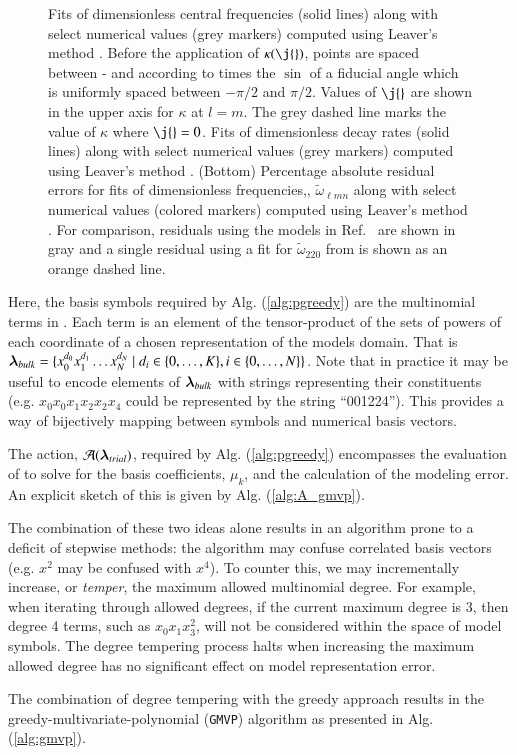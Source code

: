 \documentclass[twocolumn,aps,prd,floatfix,preprintnumbers,a4paper,nofootinbib,
superscriptaddress,10pt]{revtex4-1}
\newcommand{\cw}{\tilde{\omega}}
\def\lmn{_{\ell m n}}
\def\gmvp#1{greedy-multivariate-polynomial#1
  (\texttt{GMVP}#1)\gdef\gmvp{\texttt{GMVP}}}
\def\CwFitCalibrationRegion{\red{0.995} }
\begin{document}
\begin{figure}[htb]
\begin{tabular}{ll}
  \end{tabular}
	\caption{ Fits of dimensionless \qnm{} central frequencies (solid lines) along with select numerical values (grey markers) computed using Leaver's method \cite{Leaver85}.
  Before the application of $\kappa(\j{})$, points are spaced between -\CwFitCalibrationRegion and \CwFitCalibrationRegion according to \CwFitCalibrationRegion times the $\sin$ of a fiducial angle which is uniformly spaced between $-\pi/2$ and $\pi/2$. Values of $\j{}$ are shown in the upper axis for $\kappa$ at $l=m$.
  The grey dashed line marks the value of $\kappa$ where $\j{}=0$. Fits of dimensionless \qnm{} decay rates (solid lines) along with select numerical values (grey markers) computed using Leaver's method \cite{Leaver85}. (Bottom) Percentage absolute residual errors for fits of dimensionless \qnm{} frequencies,, $\cw\lmn$ along with select numerical values (colored markers) computed using Leaver's method \cite{Leaver85}. For comparison, residuals using the models in Ref.~\cite{Berti:2005ys} are shown in gray and a single residual using a fit for $\cw_{220}$ from \cite{Nagar:2018zoe} is shown as an orange dashed line.}
  \label{fig:qnm}
\end{figure}
%
\par Here, the basis symbols required by Alg. (\ref{alg:pgreedy}) are the multinomial terms in .
%
Each term is an element of the tensor-product of the sets of powers of each coordinate of a chosen representation of the models domain. That is ${\bm{\lambda}}_{bulk} = \{x_0^{d_0} x_1^{d_1} \ldots x_N^{d_N} \mid d_i \in \{0,\ldots,K\}, i \in \{0,\ldots,N\}\}$.
%
Note that in practice it may be useful to encode elements of ${\bm{\lambda}}_{bulk}$ with strings representing their constituents (e.g. $x_0 x_0 x_1 x_2 x_2 x_4$ could be represented by the string ``001224''). This provides a way of bijectively mapping between symbols and numerical basis vectors.
%
\par The action, $\mathcal{A}({\bm{\lambda}}_{trial})$, required by Alg. (\ref{alg:pgreedy}) encompasses the evaluation of  to solve for the basis coefficients, $\mu_k$, and the calculation of the modeling error.
%
An explicit sketch of this is given by Alg. (\ref{alg:A_gmvp}).
%
\par The combination of these two ideas alone results in an algorithm prone to a deficit of stepwise methods: the algorithm may confuse correlated basis vectors (e.g. $x^2$ may be confused with $x^4$).
%
To counter this, we may incrementally increase, or \textit{temper}, the maximum allowed multinomial degree.
%
For example, when iterating through allowed degrees, if the current maximum degree is 3, then degree 4 terms, such as $x_0x_1x_3^2$, will not be considered within the space of model symbols.
%
The degree tempering process halts when increasing the maximum allowed degree has no significant effect on model representation error.
%
\par The combination of degree tempering with the greedy approach results in the \gmvp{} algorithm as presented in Alg. (\ref{alg:gmvp}).
%
%
\end{document}
